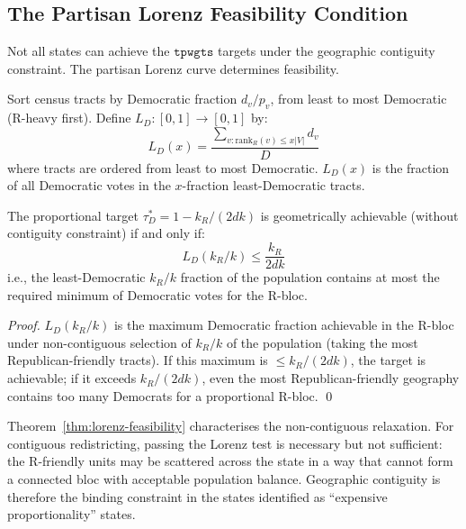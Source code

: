 \subsection{The Partisan Lorenz Feasibility Condition}

Not all states can achieve the $\mathtt{tpwgts}$ targets under the geographic
contiguity constraint. The partisan Lorenz curve determines feasibility.

\begin{definition}
\label{def:lorenz}
Sort census tracts by Democratic fraction $d_v / p_v$, from least to most
Democratic (R-heavy first). Define $L_D : [0,1] \to [0,1]$ by:
\[
  L_D(x) = \frac{\sum_{v : \mathrm{rank}_R(v) \leq x|V|} d_v}{D}
\]
where tracts are ordered from least to most Democratic.
$L_D(x)$ is the fraction of all Democratic votes in the $x$-fraction least-Democratic tracts.
\end{definition}

\begin{theorem}
\label{thm:lorenz-feasibility}
The proportional target $\tau_D^* = 1 - k_R/(2dk)$ is geometrically achievable
(without contiguity constraint) if and only if:
\[
  L_D(k_R/k) \leq \frac{k_R}{2dk}
\]
i.e., the least-Democratic $k_R/k$ fraction of the population contains at most
the required minimum of Democratic votes for the R-bloc.
\end{theorem}

\begin{proof}
$L_D(k_R/k)$ is the maximum Democratic fraction achievable in the R-bloc under
non-contiguous selection of $k_R/k$ of the population (taking the most
Republican-friendly tracts). If this maximum is $\leq k_R/(2dk)$, the target
is achievable; if it exceeds $k_R/(2dk)$, even the most Republican-friendly
geography contains too many Democrats for a proportional R-bloc. \qed
\end{proof}

\begin{remark}
Theorem~\ref{thm:lorenz-feasibility} characterises the non-contiguous
relaxation. For contiguous redistricting, passing the Lorenz test is necessary
but not sufficient: the R-friendly units may be scattered across the state in a
way that cannot form a connected bloc with acceptable population balance.
Geographic contiguity is therefore the binding constraint in the states
identified as ``expensive proportionality'' states.
\end{remark}

